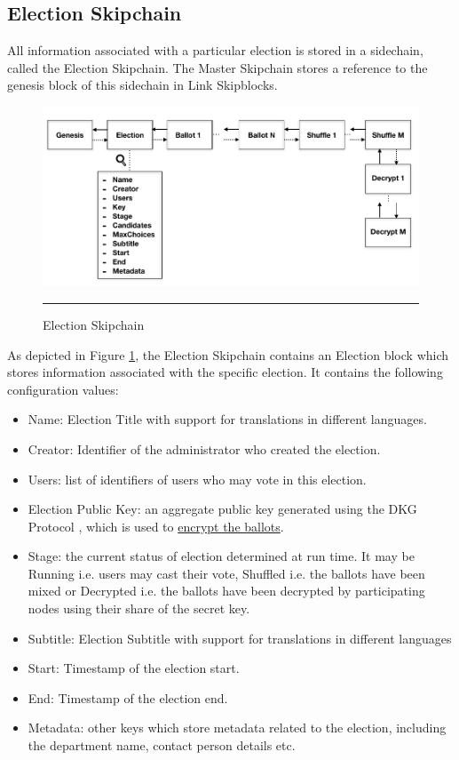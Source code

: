 \subsection{Election Skipchain}

All information associated with a particular election is stored in a sidechain, called the Election Skipchain. The Master Skipchain stores a reference to the genesis block of this sidechain in Link Skipblocks.

\begin{figure}[ht]
  \centering
    \includegraphics[scale=0.4]{Figures/ElectionSkipchain.png}
    \rule{35em}{0.5pt}
  \caption[Election Skipchain]{Election Skipchain}
  \label{fig:ElectionSkipchain}
\end{figure}

As depicted in Figure \ref{fig:ElectionSkipchain}, the Election Skipchain contains an Election block which stores information associated with the specific election. It contains the following configuration values:

\begin{itemize}
\item Name: Election Title with support for translations in different languages.
\item Creator: Identifier of the administrator who created the election.
\item Users: list of identifiers of users who may vote in this election.
\item Election Public Key: an aggregate public key generated using the DKG Protocol \cite{dkg}, which is used to \hyperref[sec:dkg]{encrypt the ballots}.
\item Stage: the current status of election determined at run time. It may be Running i.e. users may cast their vote, Shuffled i.e. the ballots have been mixed or Decrypted i.e. the ballots have been decrypted by participating nodes using their share of the secret key.
\item Subtitle: Election Subtitle with support for translations in different languages
\item Start: Timestamp of the election start.
\item End: Timestamp of the election end.
\item Metadata: other keys which store metadata related to the election, including the department name, contact person details etc.
\end{itemize}

